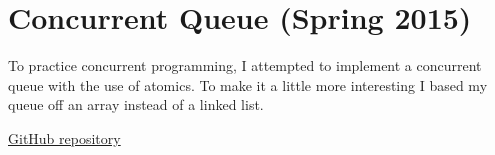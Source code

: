 
\section{Concurrent Queue (Spring 2015)}

To practice concurrent programming, I attempted to implement a
concurrent queue with the use of atomics. To make it a little more
interesting I based my queue off an array instead of a linked list.

\href{github.com/MichaelMitchellM/AtomicQueue}{GitHub repository}